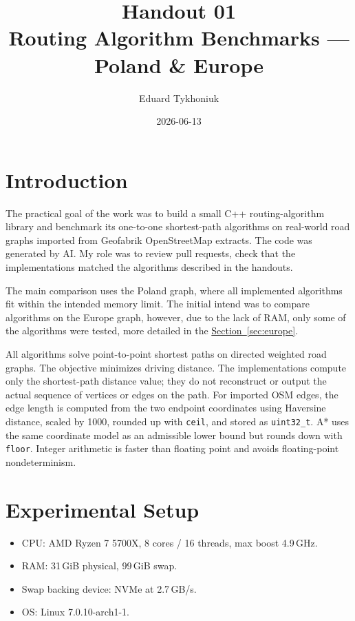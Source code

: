 \documentclass[11pt,a4paper]{article}
\title{\textbf{Handout 01}\\[0.3em]
  \large Routing Algorithm Benchmarks --- Poland \& Europe}
\author{Eduard Tykhoniuk}
\date{2026-06-13}
\begin{document}
\maketitle
\tableofcontents
\newpage

\section{Introduction}

The practical goal of the work was to build a small C++ routing-algorithm
library and benchmark its one-to-one shortest-path algorithms on real-world road
graphs imported from Geofabrik OpenStreetMap extracts.  The code was generated
by AI.  My role was to review pull requests, check that the implementations
matched the algorithms described in the handouts.

The main comparison uses the Poland graph, where all implemented algorithms fit
within the intended memory limit.  The initial intend was to compare algorithms
on the Europe graph, however, due to the lack of RAM, only some of the algorithms
were tested, more detailed in the \hyperref[sec:europe]{Section~\ref*{sec:europe}}.

All algorithms solve point-to-point shortest paths on directed weighted road
graphs.  The objective minimizes driving distance.  The implementations compute
only the shortest-path distance value; they do not reconstruct or output the
actual sequence of vertices or edges on the path.  For imported OSM edges,
the edge length is computed from the two endpoint coordinates using Haversine
distance, scaled by 1000, rounded up with \texttt{ceil}, and stored as
\texttt{uint32\_t}.  A* uses the same coordinate model as an admissible lower
bound but rounds down with \texttt{floor}.  Integer arithmetic is faster than
floating point and avoids floating-point nondeterminism.

\section{Experimental Setup}
\label{sec:setup}

\begin{itemize}
  \item CPU: AMD Ryzen 7 5700X, 8 cores / 16 threads, max boost 4.9\,GHz.
  \item RAM: 31\,GiB physical, 99\,GiB swap.
  \item Swap backing device: NVMe at 2.7\,GB/s.
  \item OS: Linux 7.0.10-arch1-1.
\end{itemize}
\end{document}
